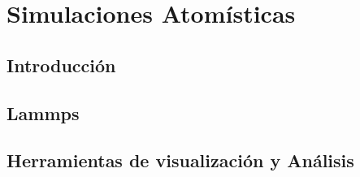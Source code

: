 
\chapter{Simulaciones Atom\'isticas} %

\label{Chapter2} %



\section{Introducci\'on}




\section{Lammps}




\section{Herramientas de visualizaci\'on y An\'alisis}

